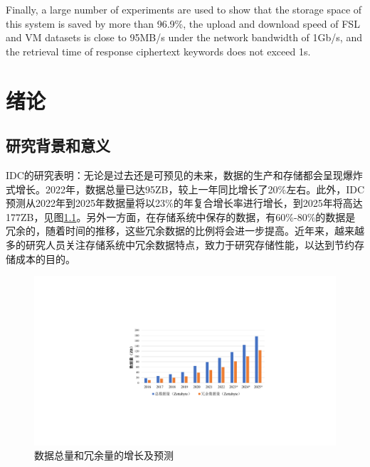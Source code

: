 \documentclass[promaster]{thesis-uestc}
\begin{document}
\begin{englishabstract}
    Finally, a large number of experiments are used to show that the storage space of this system is saved by more than 96.9\%, the upload and download speed of FSL and VM datasets is close to 95MB/s under the network bandwidth of 1Gb/s, and the retrieval time of response ciphertext keywords does not exceed 1s.


\end{englishabstract}

\thesistableofcontents %
\thesisglossarylist %

\chapter{绪\hspace{6pt}论}


\section{研究背景和意义}\label{研究背景和意义}
\acrlong{IDC}的研究表明：无论是过去还是可预见的未来，数据的生产和存储都会呈现爆炸式增长。2022年，数据总量已达95\acrshort{ZB}，较上一年同比增长了20\%左右。此外，\acrlong{IDC}预测从2022年到2025年数据量将以23\%的年复合增长率进行增长，到2025年将高达177\acrshort{ZB}，见图\ref{数据总量和冗余量的增长及预测}。另外一方面，在存储系统中保存的数据，有60\%-80\%的数据是冗余的，随着时间的推移，这些冗余数据的比例将会进一步提高。近年来，越来越多的研究人员关注存储系统中冗余数据特点，致力于研究存储性能，以达到节约存储成本的目的。

\begin{figure}[htbp]
    \centering
    \includegraphics[width = 0.9\linewidth]{pic/数据增长图}
    \caption{数据总量和冗余量的增长及预测}
    \label{数据总量和冗余量的增长及预测}
\end{figure}
\end{document}
